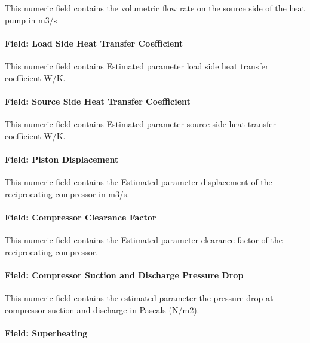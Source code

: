 This numeric field contains the volumetric flow rate on the source side of the heat pump in m3/s

\paragraph{Field: Load Side Heat Transfer Coefficient}\label{field-load-side-heat-transfer-coefficient}

This numeric field contains Estimated parameter load side heat transfer coefficient W/K.

\paragraph{Field: Source Side Heat Transfer Coefficient}\label{field-source-side-heat-transfer-coefficient-000}

This numeric field contains Estimated parameter source side heat transfer coefficient W/K.

\paragraph{Field: Piston Displacement}\label{field-piston-displacement}

This numeric field contains the Estimated parameter displacement of the reciprocating compressor in m3/s.

\paragraph{Field: Compressor Clearance Factor}\label{field-compressor-clearance-factor-000}

This numeric field contains the Estimated parameter clearance factor of the reciprocating compressor.

\paragraph{Field: Compressor Suction and Discharge Pressure Drop}\label{field-compressor-suction-and-discharge-pressure-drop}

This numeric field contains the estimated parameter the pressure drop at compressor suction and discharge in Pascals (N/m2).

\paragraph{Field: Superheating}\label{field-superheating}

